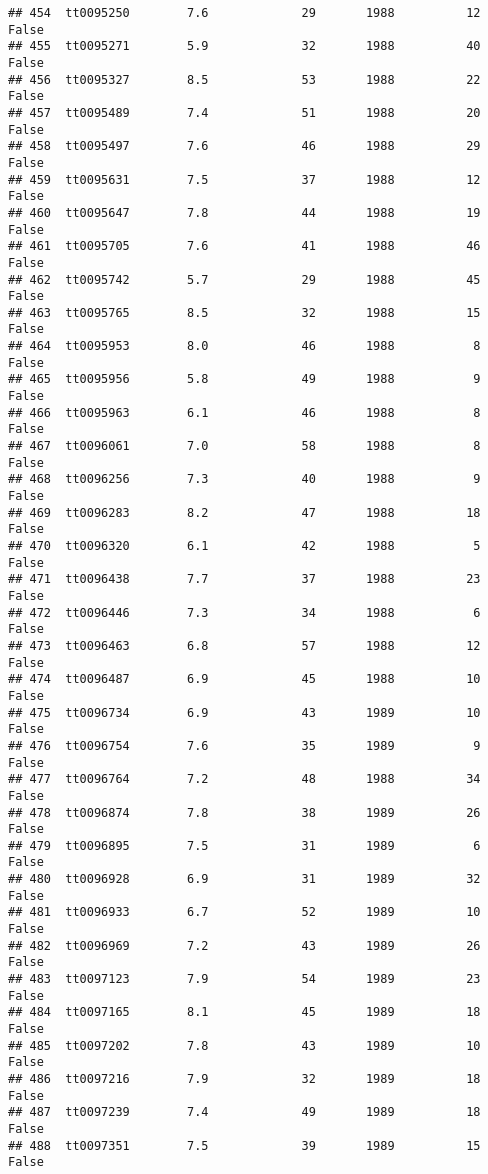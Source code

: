 \documentclass[
]{article}
\begin{document}
\begin{verbatim}
## 454  tt0095250        7.6             29       1988          12   False
## 455  tt0095271        5.9             32       1988          40   False
## 456  tt0095327        8.5             53       1988          22   False
## 457  tt0095489        7.4             51       1988          20   False
## 458  tt0095497        7.6             46       1988          29   False
## 459  tt0095631        7.5             37       1988          12   False
## 460  tt0095647        7.8             44       1988          19   False
## 461  tt0095705        7.6             41       1988          46   False
## 462  tt0095742        5.7             29       1988          45   False
## 463  tt0095765        8.5             32       1988          15   False
## 464  tt0095953        8.0             46       1988           8   False
## 465  tt0095956        5.8             49       1988           9   False
## 466  tt0095963        6.1             46       1988           8   False
## 467  tt0096061        7.0             58       1988           8   False
## 468  tt0096256        7.3             40       1988           9   False
## 469  tt0096283        8.2             47       1988          18   False
## 470  tt0096320        6.1             42       1988           5   False
## 471  tt0096438        7.7             37       1988          23   False
## 472  tt0096446        7.3             34       1988           6   False
## 473  tt0096463        6.8             57       1988          12   False
## 474  tt0096487        6.9             45       1988          10   False
## 475  tt0096734        6.9             43       1989          10   False
## 476  tt0096754        7.6             35       1989           9   False
## 477  tt0096764        7.2             48       1988          34   False
## 478  tt0096874        7.8             38       1989          26   False
## 479  tt0096895        7.5             31       1989           6   False
## 480  tt0096928        6.9             31       1989          32   False
## 481  tt0096933        6.7             52       1989          10   False
## 482  tt0096969        7.2             43       1989          26   False
## 483  tt0097123        7.9             54       1989          23   False
## 484  tt0097165        8.1             45       1989          18   False
## 485  tt0097202        7.8             43       1989          10   False
## 486  tt0097216        7.9             32       1989          18   False
## 487  tt0097239        7.4             49       1989          18   False
## 488  tt0097351        7.5             39       1989          15   False

\end{verbatim}
\end{document}

